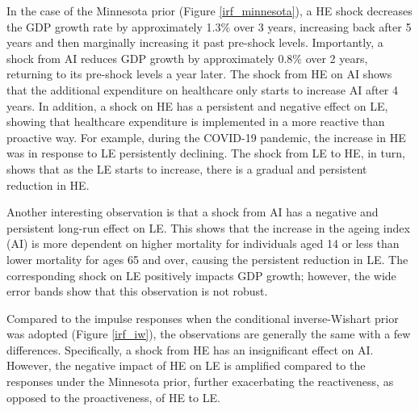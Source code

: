 \documentclass[11pt,preprint, authoryear]{elsarticle}
\numberwithin{equation}{section}
\numberwithin{figure}{section}
\numberwithin{table}{section}
\begin{document}
In the case of the Minnesota prior (Figure \ref{irf_minnesota}), a HE
shock decreases the GDP growth rate by approximately 1.3\(\%\) over 3
years, increasing back after 5 years and then marginally increasing it
past pre-shock levels. Importantly, a shock from AI reduces GDP growth
by approximately 0.8\(\%\) over 2 years, returning to its pre-shock
levels a year later. The shock from HE on AI shows that the additional
expenditure on healthcare only starts to increase AI after 4 years. In
addition, a shock on HE has a persistent and negative effect on LE,
showing that healthcare expenditure is implemented in a more reactive
than proactive way. For example, during the COVID-19 pandemic, the
increase in HE was in response to LE persistently declining. The shock
from LE to HE, in turn, shows that as the LE starts to increase, there
is a gradual and persistent reduction in HE.

Another interesting observation is that a shock from AI has a negative
and persistent long-run effect on LE. This shows that the increase in
the ageing index (AI) is more dependent on higher mortality for
individuals aged 14 or less than lower mortality for ages 65 and over,
causing the persistent reduction in LE. The corresponding shock on LE
positively impacts GDP growth; however, the wide error bands show that
this observation is not robust.

Compared to the impulse responses when the conditional inverse-Wishart
prior was adopted (Figure \ref{irf_iw}), the observations are generally
the same with a few differences. Specifically, a shock from HE has an
insignificant effect on AI. However, the negative impact of HE on LE is
amplified compared to the responses under the Minnesota prior, further
exacerbating the reactiveness, as opposed to the proactiveness, of HE to
LE.
\end{document}
